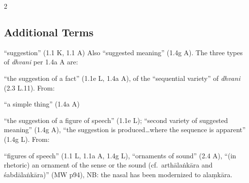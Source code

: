 \documentclass[10pt]{article}
\begin{document}
\begin{multicols}{2}
\begin{enumerate}[
			leftmargin=0em,
			rightmargin=0em,
		]
	\end{enumerate}


	\subsection{Additional Terms}

	\begin{enumerate}[
			leftmargin=0em,
			rightmargin=0em,
		]
		\setlength{\itemsep}{0.15em}
		\setcounter{enumi}{7}%

		 ``suggestion'' (1.1 K, 1.1 A)
		Also ``suggested meaning'' (1.4g A).
		The three types of \textit{dhvani} per 1.4a A are:
		\begin{enumerate}

			 ``the suggestion of a fact'' (1.1e L, 1.4a A), %
			of the ``sequential variety'' of \textit{dhvani} (2.3 L.11).
			From:
			\begin{itemize}
				 ``a simple thing'' (1.4a A)
			\end{itemize}

			 ``the suggestion of a figure of speech'' (1.1e L);
			``second variety of suggested meaning'' (1.4g A),
			``the suggestion is produced\dots where the sequence is apparent'' (1.4g L). %
			From:
			\begin{itemize}
				 ``figures of speech'' (1.1 L, 1.1a A, 1.4g L),
				``ornaments of sound'' (2.4 A),
				``(in rhetoric) an ornament of the sense or the sound (cf.\ arthālaṅkāra and śabdālaṅkāra)'' (MW p94),
				NB: the nasal has been modernized to alaṃkāra.
			\end{itemize}
			


\end{enumerate}
\end{enumerate}
\end{multicols}
\end{document}
